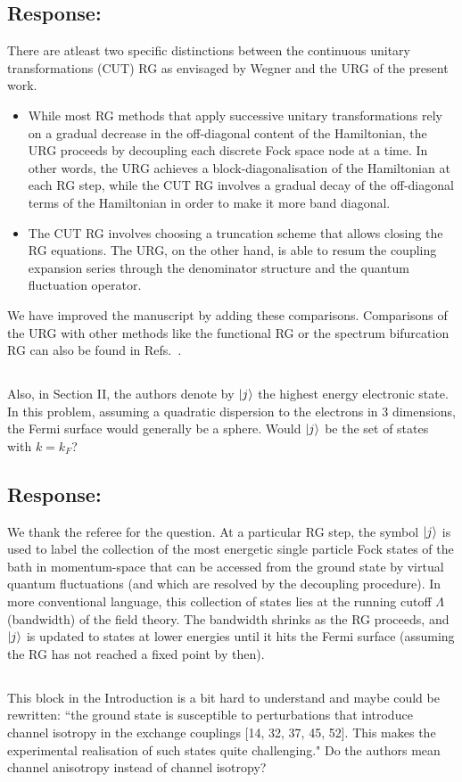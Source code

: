\documentclass{article}
\newcommand{\response}[1]{{\color{blue}\subsection*{Response:}{#1}}}
\newcommand{\point}[1]{\subsection{}{#1}}
\begin{document}
\response{
There are atleast two specific distinctions between the continuous unitary transformations (CUT) RG as envisaged by Wegner and the URG of the present work.
\begin{itemize}
	\item While most RG methods that apply successive unitary transformations rely on a gradual decrease in the off-diagonal content of the Hamiltonian, the URG proceeds by decoupling each discrete Fock space node at a time. In other words, the URG achieves a block-diagonalisation of the Hamiltonian at each RG step, while the CUT RG involves a gradual decay of the off-diagonal terms of the Hamiltonian in order to make it more band diagonal.
	\item The CUT RG involves choosing a truncation scheme that allows closing the RG equations. The URG, on the other hand, is able to resum the coupling expansion series through the denominator structure and the quantum fluctuation operator.  
\end{itemize}
We have improved the manuscript by adding these comparisons. Comparisons of the URG with other methods like the functional RG or the spectrum bifurcation RG can also be found in Refs.~\cite{anirbanmott1,anirbanurg1}.
}

\point{Also, in Section II, the authors denote by $\ket{j}$ the highest energy electronic state. In this problem, assuming a quadratic dispersion to the electrons in 3 dimensions, the Fermi surface would generally be a sphere. Would $\ket{j}$ be the set of states with $k=k_{F}$?}

\response{We thank the referee for the question. At a particular RG step, the symbol \(\ket{j}\) is used to label the collection of the most energetic single particle Fock states of the bath in momentum-space that can be accessed from the ground state by virtual quantum fluctuations (and which are resolved by the decoupling procedure). In more conventional language, this collection of states lies at the running cutoff \(\Lambda\) (bandwidth) of the field theory. The bandwidth shrinks as the RG proceeds, and \(\ket{j}\) is updated to states at lower energies until it hits the Fermi surface (assuming the RG has not reached a fixed point by then).
}

\point{
This block in the Introduction is a bit hard to understand and maybe could be rewritten: ``the ground state is susceptible to perturbations that introduce channel isotropy in the exchange couplings [14, 32, 37, 45, 52]. This makes the experimental realisation of such states quite challenging." Do the authors mean channel anisotropy instead of channel isotropy?}
\end{document}
